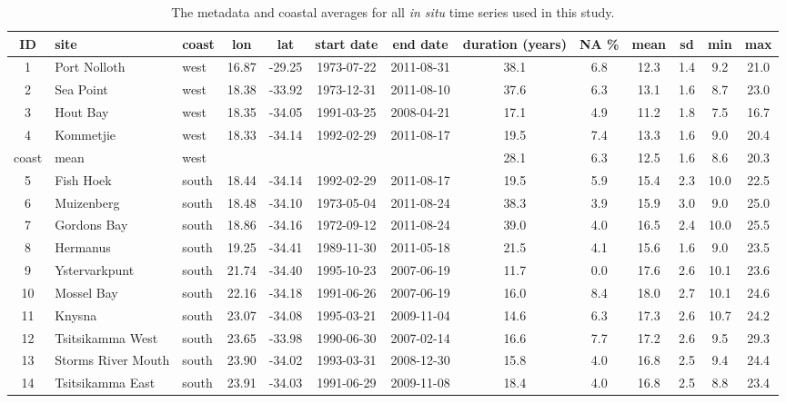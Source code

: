 \documentclass[a4paper,10pt,review]{elsarticle}
\begin{document}
\begin{table}[]
\caption{\small The metadata and coastal averages for all \emph{in situ} time series used in this study.}
\label{tableS1}
\centering
\tiny
\begin{tabular}{cllcccccccccc}
  \hline
 ID & site & coast & lon & lat & start date & end date & duration (years) & NA \% & mean & sd & min & max \\
  \hline
1 & Port Nolloth & west & 16.87 & -29.25 & 1973-07-22 & 2011-08-31 & 38.1 & 6.8 & 12.3 & 1.4 & 9.2 & 21.0 \\
2 & Sea Point & west & 18.38 & -33.92 & 1973-12-31 & 2011-08-10 & 37.6 & 6.3 & 13.1 & 1.6 & 8.7 & 23.0 \\
3 & Hout Bay & west & 18.35 & -34.05 & 1991-03-25 & 2008-04-21 & 17.1 & 4.9 & 11.2 & 1.8 & 7.5 & 16.7 \\
4 & Kommetjie & west & 18.33 & -34.14 & 1992-02-29 & 2011-08-17 & 19.5 & 7.4 & 13.3 & 1.6 & 9.0 & 20.4 \\
coast & mean & west &  &  &  &  & 28.1 & 6.3 & 12.5 & 1.6 & 8.6 & 20.3 \\
5 & Fish Hoek & south & 18.44 & -34.14 & 1992-02-29 & 2011-08-17 & 19.5 & 5.9 & 15.4 & 2.3 & 10.0 & 22.5 \\
6 & Muizenberg & south & 18.48 & -34.10 & 1973-05-04 & 2011-08-24 & 38.3 & 3.9 & 15.9 & 3.0 & 9.0 & 25.0 \\
7 & Gordons Bay & south & 18.86 & -34.16 & 1972-09-12 & 2011-08-24 & 39.0 & 4.0 & 16.5 & 2.4 & 10.0 & 25.5 \\
8 & Hermanus & south & 19.25 & -34.41 & 1989-11-30 & 2011-05-18 & 21.5 & 4.1 & 15.6 & 1.6 & 9.0 & 23.5 \\
9 & Ystervarkpunt & south & 21.74 & -34.40 & 1995-10-23 & 2007-06-19 & 11.7 & 0.0 & 17.6 & 2.6 & 10.1 & 23.6 \\
10 & Mossel Bay & south & 22.16 & -34.18 & 1991-06-26 & 2007-06-19 & 16.0 & 8.4 & 18.0 & 2.7 & 10.1 & 24.6 \\
11 & Knysna & south & 23.07 & -34.08 & 1995-03-21 & 2009-11-04 & 14.6 & 6.3 & 17.3 & 2.6 & 10.7 & 24.2 \\
12 & Tsitsikamma West & south & 23.65 & -33.98 & 1990-06-30 & 2007-02-14 & 16.6 & 7.7 & 17.2 & 2.6 & 9.5 & 29.3 \\
13 & Storms River Mouth & south & 23.90 & -34.02 & 1993-03-31 & 2008-12-30 & 15.8 & 4.0 & 16.8 & 2.5 & 9.4 & 24.4 \\
14 & Tsitsikamma East & south & 23.91 & -34.03 & 1991-06-29 & 2009-11-08 & 18.4 & 4.0 & 16.8 & 2.5 & 8.8 & 23.4 \\

\end{tabular}
\end{table}
\end{document}
